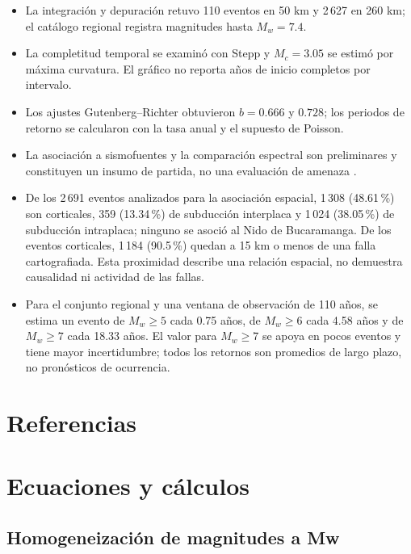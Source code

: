 \documentclass[12pt,oneside]{report}
\begin{document}
\begin{itemize}
    \item La integración y depuración retuvo 110 eventos en 50 km y 2\,627 en 260 km; el catálogo regional registra magnitudes hasta $M_w=7.4$.
    \item La completitud temporal se examinó con Stepp y $M_c=3.05$ se estimó por máxima curvatura. El gráfico no reporta años de inicio completos por intervalo.
    \item Los ajustes Gutenberg--Richter obtuvieron $b=0.666$ y $0.728$; los periodos de retorno se calcularon con la tasa anual y el supuesto de Poisson.
    \item La asociación a sismofuentes y la comparación espectral son preliminares y constituyen un insumo de partida, no una evaluación de amenaza \parencite{nsr10,sgc2018amenaza}.
    \item De los 2\,691 eventos analizados para la asociación espacial, 1\,308 (48.61\,\%) son corticales, 359 (13.34\,\%) de subducción interplaca y 1\,024 (38.05\,\%) de subducción intraplaca; ninguno se asoció al Nido de Bucaramanga. De los eventos corticales, 1\,184 (90.5\,\%) quedan a 15 km o menos de una falla cartografiada. Esta proximidad describe una relación espacial, no demuestra causalidad ni actividad de las fallas.
    \item Para el conjunto regional y una ventana de observación de 110 años, se estima un evento de $M_w\geq5$ cada 0.75 años, de $M_w\geq6$ cada 4.58 años y de $M_w\geq7$ cada 18.33 años. El valor para $M_w\geq7$ se apoya en pocos eventos y tiene mayor incertidumbre; todos los retornos son promedios de largo plazo, no pronósticos de ocurrencia.
\end{itemize}

\clearpage
\chapter*{Referencias}
\printbibliography[heading=none]

\clearpage
\appendix
\renewcommand{\chaptername}{Anexo}
\chapter{Ecuaciones y cálculos}
\label{app:ecuaciones}

\section{Homogeneización de magnitudes a Mw}
\label{app:conversiones}
\end{document}
